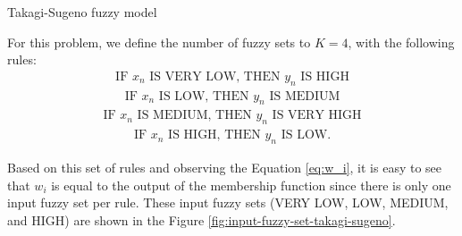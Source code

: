 \documentclass[english]{sobraep}
\begin{document}
\begin{algorithm}[!ht]
    \DontPrintSemicolon
      
    
    \caption{Takagi-Sugeno fuzzy model}
    \label{alg:takagi-sugeno-fuzzy}
\end{algorithm}

For this problem, we define the number of fuzzy sets to \(K=4\), with the following rules:
\begin{align}
    \text{IF } x_n \text{ IS VERY LOW, THEN } y_n \text{ IS HIGH} \nonumber
\end{align}
\begin{align}
    \text{IF } x_n \text{ IS LOW, THEN } y_n \text{ IS MEDIUM} \nonumber
\end{align}
\begin{align}
    \text{IF } x_n \text{ IS MEDIUM, THEN } y_n \text{ IS VERY HIGH} \nonumber
\end{align}
\begin{align}
    \text{IF } x_n \text{ IS HIGH, THEN } y_n \text{ IS LOW}. \nonumber
\end{align}

Based on this set of rules and observing the Equation \eqref{eq:w_i}, it is easy to see that \(w_i\) is equal to the output of the membership function since there is only one input fuzzy set per rule. These input fuzzy sets (VERY LOW, LOW, MEDIUM, and HIGH) are shown in the Figure \ref{fig:input-fuzzy-set-takagi-sugeno}.
\end{document}
